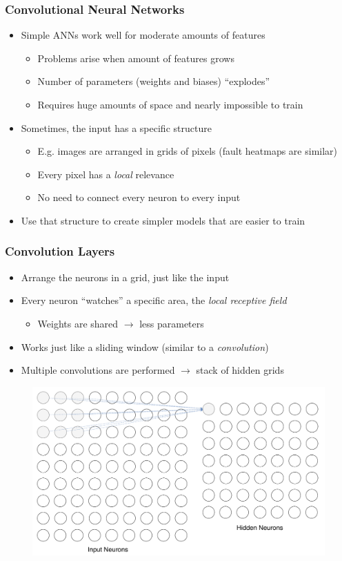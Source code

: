 \begin{frame}
  \frametitle{Convolutional Neural Networks}
  \begin{itemize}
    \item Simple ANNs work well for moderate amounts of features
      \begin{itemize}
        \item Problems arise when amount of features grows
        \item Number of parameters (weights and biases) ``explodes''
        \item Requires huge amounts of space and nearly impossible to
          train
      \end{itemize}
    \item Sometimes, the input has a specific structure
      \begin{itemize}
        \item E.g. images are arranged in grids of pixels (fault
          heatmaps are similar)
        \item Every pixel has a \textit{local} relevance
        \item No need to connect every neuron to every input
      \end{itemize}
    \item Use that structure to create simpler models that are easier
      to train
  \end{itemize}
\end{frame}

\begin{frame}
  \frametitle{Convolution Layers}
  \begin{itemize}
    \item Arrange the neurons in a grid, just like the input
    \item Every neuron ``watches'' a specific area, the \textit{local
      receptive field}
      \begin{itemize}
        \item Weights are shared \(\rightarrow\) less parameters
      \end{itemize}
    \item Works just like a sliding window (similar to a
      \textit{convolution})
    \item Multiple convolutions are performed \(\rightarrow\) stack of
      hidden grids
  \end{itemize}
  \begin{figure}
    \includegraphics[width=.7\textwidth]{../figures/receptive_field}
  \end{figure}
\end{frame}

